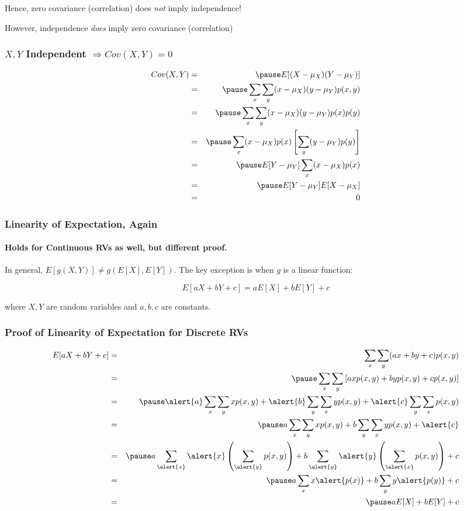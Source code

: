 \documentclass[handout]{beamer}
\begin{document}
\begin{frame}
\huge
Hence, zero covariance (correlation) does \emph{not} imply independence!

\end{frame}
\begin{frame}
\huge
However, independence \emph{does} imply zero covariance (correlation)

\end{frame}
\begin{frame}
\frametitle{$X,Y$ Independent $\Rightarrow Cov(X,Y) = 0$}
\begin{eqnarray*}
	Cov(X,Y) &=&\pause E[(X-\mu_X)(Y-\mu_Y)]\\
	&=&\pause \sum_x \sum_y (x - \mu_X)(y- \mu_Y)p(x,y)\\
	&=&\pause  \sum_x \sum_y (x - \mu_X)(y- \mu_Y)p(x)p(y) \\
	&=& \pause \sum_x  (x - \mu_X)p(x)\left[ \sum_y (y- \mu_Y)p(y)\right] \\
	&=& \pause E[Y- \mu_Y] \sum_x  (x - \mu_X)p(x)\\
	&=& \pause E[Y- \mu_Y]E[X- \mu_X] \\
	&=& 0
\end{eqnarray*}
\end{frame}

\begin{frame}
\frametitle{Linearity of Expectation, Again}
\framesubtitle{Holds for Continuous RVs as well, but different proof.}
In general, $E[g(X,Y)]\neq g(E[X],E[Y])$. The key exception is when $g$ is a linear function:

\Large
$$\boxed{E[aX + bY + c] = aE[X] + bE[Y] + c}$$

\normalsize
where $X,Y$ are random variables and $a,b,c$ are constants.
\end{frame}
\begin{frame}
\frametitle{Proof of Linearity of Expectation for Discrete RVs}
\footnotesize
\begin{eqnarray*}
	E[aX+bY+c] &=& \sum_x \sum_y (ax+by+c) p(x,y) \\
		&=& \pause \sum_x \sum_y\left[ axp(x,y) + byp(x,y) + cp(x,y)\right]\\
		&=&\pause \alert{a} \sum_x \sum_y xp(x,y) + \alert{b}\sum_y \sum_x y p(x,y) + \alert{c} \sum_y \sum_x  p(x,y) \\
		&=& \pause a \sum_x \sum_y xp(x,y) + b\sum_y \sum_x y p(x,y) + \alert{c}\\
				&=& \pause a \sum_{\alert{x}} \alert{x} \left(\sum_{\alert{y}} p(x,y)\right) + b\sum_{\alert{y}} \alert{y} \left(\sum_{\alert{x}}  p(x,y)\right) + c\\
		&=& \pause a\sum_x x \alert{p(x)} + b\sum_y y  \alert{p(y)}+c\\
		&=& \pause aE[X] + bE[Y] + c
\end{eqnarray*}
\end{frame}
\end{document}
